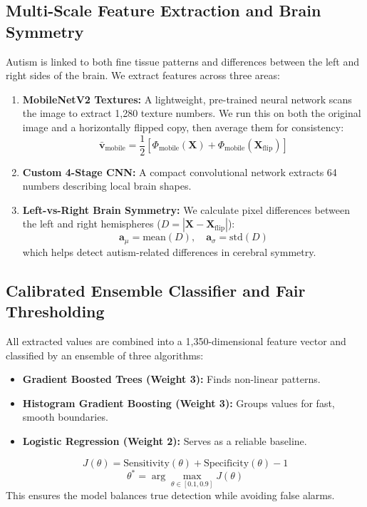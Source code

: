 \documentclass[conference]{IEEEtran}
\begin{document}
\subsection{Multi-Scale Feature Extraction and Brain Symmetry}
Autism is linked to both fine tissue patterns and differences between the left and right sides of the brain. We extract features across three areas:
\begin{enumerate}
    \item \textbf{MobileNetV2 Textures:} A lightweight, pre-trained neural network scans the image to extract 1,280 texture numbers. We run this on both the original image and a horizontally flipped copy, then average them for consistency:
    \begin{equation}
    \bar{\mathbf{v}}_{\text{mobile}} = \frac{1}{2}[\Phi_{\text{mobile}}(\mathbf{X}) + \Phi_{\text{mobile}}(\mathbf{X}_{\text{flip}})] \tag{6}
    \end{equation}
    \item \textbf{Custom 4-Stage CNN:} A compact convolutional network extracts 64 numbers describing local brain shapes.
    \item \textbf{Left-vs-Right Brain Symmetry:} We calculate pixel differences between the left and right hemispheres ($D = |\mathbf{X} - \mathbf{X}_{\text{flip}}|$):
    \begin{equation}
    \mathbf{a}_{\mu} = \text{mean}(D), \quad \mathbf{a}_{\sigma} = \text{std}(D) \tag{7}
    \end{equation}
    which helps detect autism-related differences in cerebral symmetry.
\end{enumerate}

\subsection{Calibrated Ensemble Classifier and Fair Thresholding}
All extracted values are combined into a 1,350-dimensional feature vector and classified by an ensemble of three algorithms:
\begin{itemize}
    \item \textbf{Gradient Boosted Trees (Weight 3):} Finds non-linear patterns.
    \item \textbf{Histogram Gradient Boosting (Weight 3):} Groups values for fast, smooth boundaries.
    \item \textbf{Logistic Regression (Weight 2):} Serves as a reliable baseline.
\end{itemize}
\begin{equation}
J(\theta) = \text{Sensitivity}(\theta) + \text{Specificity}(\theta) - 1 \tag{8}
\end{equation}
\begin{equation}
\theta^* = \arg\max_{\theta \in [0.1, 0.9]} J(\theta) \tag{9}
\end{equation}
This ensures the model balances true detection while avoiding false alarms.
\end{document}

